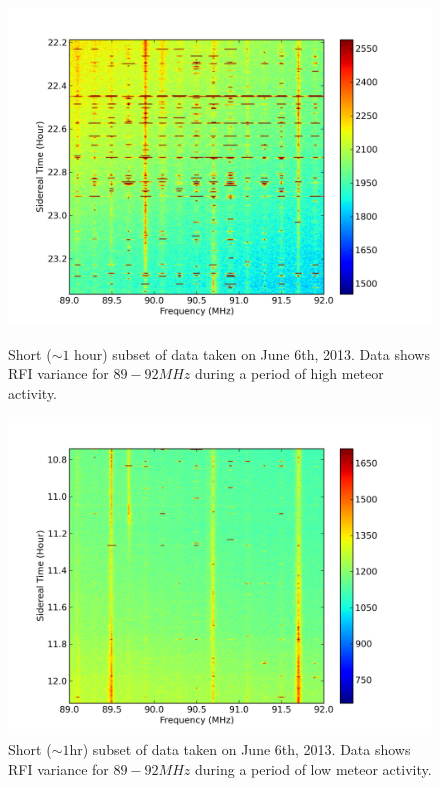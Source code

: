 \begin{figure}[htb]
\centering
\begin{minipage}[b]{0.48\textwidth}
\centering
\includegraphics[width=0.95\linewidth]{Data_analysis/figures/June_06_part_13_unmasked_FM_waterfall.png}
\caption{Short ($\sim1$ hour) subset of data taken on June 6th, 2013. Data shows RFI variance for $89-92 MHz$ during a period of high meteor activity. }
\label{Fig:RFI_wf_short_full}
\end{minipage}%
\begin{minipage}[b]{0.02\textwidth}
\hspace{1cm}
\end{minipage}%
\begin{minipage}[b]{0.48\textwidth}
\centering
\includegraphics[width=0.95\linewidth]{Data_analysis/figures/June_06_part_5_unmasked_FM_waterfall.png}
\caption{Short ($\sim1$hr) subset of data taken on June 6th, 2013. Data shows RFI variance for $89-92 MHz$ during a period of low meteor activity.}
\label{Fig:RFI_wf_short_empty}
\end{minipage}
\end{figure}

